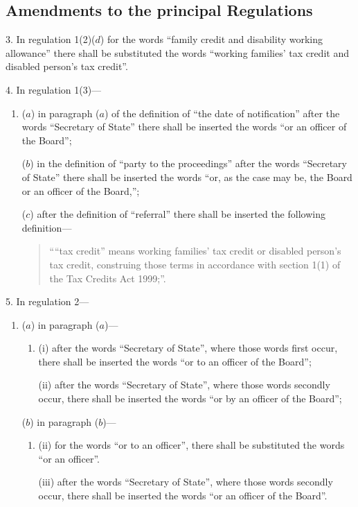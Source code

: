 \documentclass[12pt,a4paper]{article}
\begin{document}
\subsection[3--27. Amendments to the principal Regulations]{Amendments to the principal Regulations}

3.  In regulation 1(2)($d$)  for the words “family credit and disability working allowance” there shall be substituted the words “working families' tax credit and disabled person’s tax credit”.

\medskip

4.  In regulation 1(3)—
\begin{enumerate}\item[]
($a$) in paragraph ($a$)  of the definition of “the date of notification” after the words “Secretary of State” there shall be inserted the words “or an officer of the Board”;

($b$) in the definition of “party to the proceedings” after the words “Secretary of State” there shall be inserted the words “or, as the case may be, the Board or an officer of the Board,”;

($c$) after the definition of “referral” there shall be inserted the following definition—
\begin{quotation}
““tax credit” means working families' tax credit or disabled person’s tax credit, construing those terms in accordance with section 1(1) of the Tax Credits Act 1999;”.
\end{quotation}
\end{enumerate}

\medskip

5.  In regulation 2—
\begin{enumerate}\item[]
($a$) in paragraph ($a$)—
\begin{enumerate}\item[]
(i) after the words “Secretary of State”, where those words first occur, there shall be inserted the words “or to an officer of the Board”;

(ii) after the words “Secretary of State”, where those words secondly occur, there shall be inserted the words “or by an officer of the Board”;
\end{enumerate}

($b$) in paragraph ($b$)—
\begin{enumerate}\item[]
(ii) for the words “or to an officer”, there shall be substituted the words “or an officer”.

(iii) after the words “Secretary of State”, where those words secondly occur, there shall be inserted the words “or an officer of the Board”.
\end{enumerate}
\end{enumerate}
\end{document}
